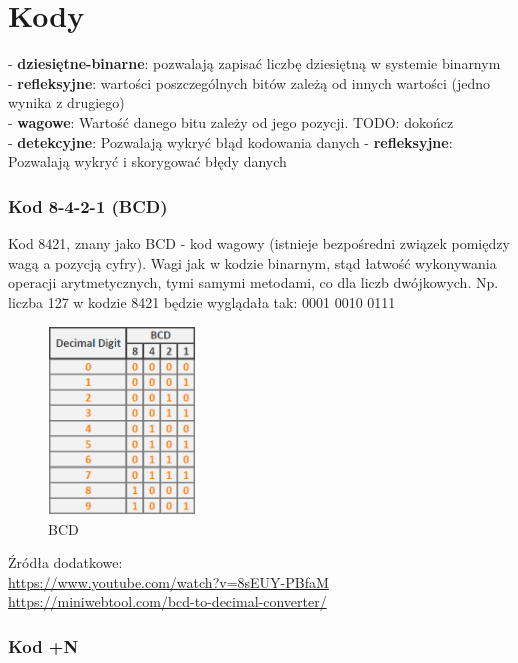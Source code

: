   \section{Kody}

  - \textbf{dziesiętne-binarne}: pozwalają zapisać liczbę dziesiętną w systemie binarnym \label{sec:intro} \\
  - \textbf{refleksyjne}: wartości poszczególnych bitów zależą od innych wartości (jedno wynika z drugiego) \\
  - \textbf{wagowe}: Wartość danego bitu zależy od jego pozycji. TODO: dokończ \\
  - \textbf{detekcyjne}: Pozwalają wykryć błąd kodowania danych
  - \textbf{refleksyjne}: Pozwalają wykryć i skorygować błędy danych

\subsubsection{Kod 8-4-2-1 (BCD)}

Kod 8421, znany jako BCD - kod wagowy (istnieje bezpośredni związek pomiędzy wagą a pozycją cyfry).
Wagi jak w kodzie binarnym, stąd łatwość wykonywania operacji arytmetycznych, tymi
samymi metodami, co dla liczb dwójkowych. Np. liczba 127 w kodzie 8421 będzie wyglądała tak: 0001 0010 0111 

\begin{figure}[h!]
    \centering
    \includegraphics[width=0.35\textwidth]{images/codes/bcd.png}
    \caption{BCD}
    \label{fig:my_label}
\end{figure}

Źródła dodatkowe: \\
\url{https://www.youtube.com/watch?v=8sEUY-PBfaM}
\url{https://miniwebtool.com/bcd-to-decimal-converter/}

\subsubsection{Kod +N}

